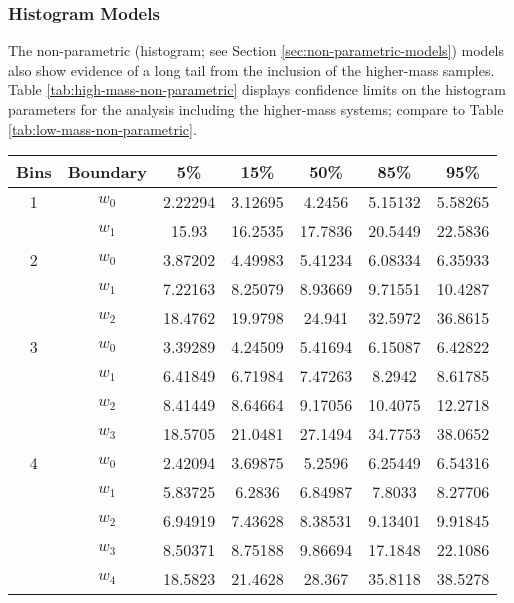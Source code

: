 \documentclass[preprint]{aastex}
\begin{document}
\subsubsection{Histogram Models}

The non-parametric (histogram; see Section
\ref{sec:non-parametric-models}) models also show evidence of a long
tail from the inclusion of the higher-mass samples.  Table
\ref{tab:high-mass-non-parametric} displays confidence limits on the
histogram parameters for the analysis including the higher-mass
systems; compare to Table \ref{tab:low-mass-non-parametric}.

\begin{table}
  \begin{center}
    \begin{tabular}{|c|c|c|c|c|c|c|}
      \hline
      Bins & Boundary & 5\% & 15\% & 50\% & 85\% & 95\% \\
      \hline \hline
      \hline
      1 & $w_0$ & 2.22294 & 3.12695 & 4.2456 & 5.15132 & 5.58265 \\
      \hline
      & $w_1$ & 15.93 & 16.2535 & 17.7836 & 20.5449 & 22.5836 \\
      \hline \hline
      2 & $w_0$ & 3.87202 & 4.49983 & 5.41234 & 6.08334 & 6.35933 \\
      \hline
      & $w_1$ & 7.22163 & 8.25079 & 8.93669 & 9.71551 & 10.4287 \\
      \hline
      & $w_2$ & 18.4762 & 19.9798 & 24.941 & 32.5972 & 36.8615 \\
      \hline \hline
      3 & $w_0$ & 3.39289 & 4.24509 & 5.41694 & 6.15087 & 6.42822 \\
      \hline
      & $w_1$ & 6.41849 & 6.71984 & 7.47263 & 8.2942 & 8.61785 \\
      \hline
      & $w_2$ & 8.41449 & 8.64664 & 9.17056 & 10.4075 & 12.2718 \\
      \hline
      & $w_3$ & 18.5705 & 21.0481 & 27.1494 & 34.7753 & 38.0652 \\
      \hline \hline
      4 & $w_0$ & 2.42094 & 3.69875 & 5.2596 & 6.25449 & 6.54316 \\
      \hline
      & $w_1$ & 5.83725 & 6.2836 & 6.84987 & 7.8033 & 8.27706 \\
      \hline
      & $w_2$ & 6.94919 & 7.43628 & 8.38531 & 9.13401 & 9.91845 \\
      \hline
      & $w_3$ & 8.50371 & 8.75188 & 9.86694 & 17.1848 & 22.1086 \\
      \hline
      & $w_4$ & 18.5823 & 21.4628 & 28.367 & 35.8118 & 38.5278 \\      

\end{tabular}
\end{center}
\end{table}
\end{document}
